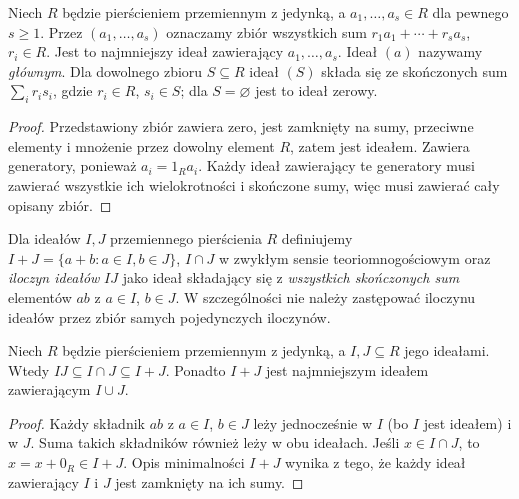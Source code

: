 \begin{definicja}
\label{aa:def:generated-ideal}
Niech $R$ będzie pierścieniem przemiennym z jedynką,
a $a_1,\ldots,a_s\in R$ dla pewnego $s\ge1$.
Przez $(a_1,\ldots,a_s)$ oznaczamy zbiór wszystkich sum $r_1a_1+\cdots+r_sa_s$,
$r_i\in R$. Jest to najmniejszy ideał zawierający
$a_1,\ldots,a_s$. Ideał $(a)$ nazywamy \emph{głównym}.
Dla dowolnego zbioru $S\subseteq R$ ideał $(S)$ składa się
ze skończonych sum $\sum_i r_i s_i$, gdzie $r_i\in R$, $s_i\in S$;
dla $S=\varnothing$ jest to ideał zerowy.
\end{definicja}
\begin{proof}
Przedstawiony zbiór zawiera zero, jest zamknięty na sumy,
przeciwne elementy i mnożenie przez dowolny element $R$,
zatem jest ideałem. Zawiera generatory, ponieważ
$a_i=1_Ra_i$. Każdy ideał zawierający te generatory musi
zawierać wszystkie ich wielokrotności i skończone sumy,
więc musi zawierać cały opisany zbiór.
\end{proof}

\begin{definicja}
\label{aa:def:ideal-ops}
Dla ideałów $I,J$ przemiennego pierścienia $R$ definiujemy
$I+J=\{a+b:a\in I,b\in J\}$, $I\cap J$ w zwykłym
sensie teoriomnogościowym oraz \emph{iloczyn ideałów}
$I J$ jako ideał składający się z \emph{wszystkich skończonych
sum} elementów $ab$ z $a\in I$, $b\in J$.
W szczególności nie należy zastępować iloczynu ideałów
przez zbiór samych pojedynczych iloczynów.
\end{definicja}
\begin{stwierdzenie}
\label{aa:st:ideals-ops}
Niech $R$ będzie pierścieniem przemiennym z jedynką,
a $I,J\subseteq R$ jego ideałami. Wtedy
$IJ\subseteq I\cap J\subseteq I+J$. Ponadto $I+J$
jest najmniejszym ideałem zawierającym $I\cup J$.
\end{stwierdzenie}
\begin{proof}
Każdy składnik $ab$ z $a\in I$, $b\in J$ leży jednocześnie
w $I$ (bo $I$ jest ideałem) i w $J$. Suma takich składników
również leży w obu ideałach. Jeśli $x\in I\cap J$,
to $x=x+0_R\in I+J$. Opis minimalności $I+J$ wynika
z tego, że każdy ideał zawierający $I$ i $J$ jest zamknięty
na ich sumy.
\end{proof}

